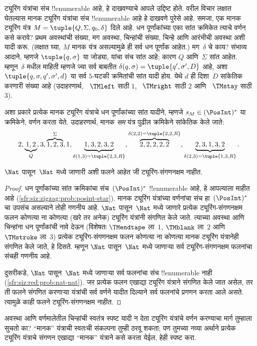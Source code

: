 \documentclass[../../../include/open-logic-section]{subfiles}
\begin{document}
\begin{explain}
ट्यूरिंग यंत्रांचा संच !!{enumerable}
आहे, हे दाखवण्याचे आपले उद्दिष्ट होते. वरील विचार
लक्षात घेतल्यास मानक ट्यूरिंग यंत्रांचा संच
!!{enumerable}
आहे हे दाखवणे पुरेसे आहे. समजा, एक मानक ट्यूरिंग
यंत्र $M = \tuple{Q, \Sigma, q_0, \delta}$ दिले
आहे. धन पूर्णांकांच्या एका सांत क्रमिकेत त्याचे
वर्णन कसे करावे? प्रथम अवस्थांची संख्या, मग
अवस्था, चिन्हांची संख्या, चिन्हे आणि आरंभीची
अवस्था अशी यादी करू. (लक्षात घ्या, $M$ मानक
यंत्र असल्यामुळे ही सर्व धन पूर्णांक आहेत.)
मग~$\delta$ चे काय? संभाव्य आदाने, म्हणजे
$\tuple{q,\sigma}$ या जोड्या, यांचा संच सांत आहे;
कारण $Q$ आणि~$\Sigma$ सांत आहेत. म्हणून~$\delta$
मधील माहिती म्हणजे ज्या सर्व बाबतीत
$\delta(q,\sigma) = \tuple{q', \sigma', D}$ आहे,
अशा $\tuple{q, \sigma, q', \sigma', d}$
या सर्व $5$-घटकी क्रमितांची सांत यादी होय.
येथे $d$ ही दिशा~$D$ सांकेतिक
करणारी संख्या आहे (उदाहरणार्थ,
~$\TMleft$ साठी $1$, ~$\TMright$ साठी $2$
आणि ~$\TMstay$ साठी $3$).

अशा प्रकारे प्रत्येक मानक ट्यूरिंग यंत्राचे
धन पूर्णांकांच्या सांत यादीने, म्हणजे
$s_M \in (\PosInt)^*$ या क्रमिकेने, वर्णन
करता येते. उदाहरणार्थ, मानक \emph{सम}
यंत्र पुढील क्रमिकेने सांकेतिक केले जाते:
\[
2, \underbrace{1, 2}_Q, 3, \overbrace{1, 2, 3}^\Sigma, 1, \underbrace{1, 3, 2, 3, 2}_{\delta(1,3) = \tuple{2,3,R}}, 
\overbrace{2, 2, 2, 2, 2}^{\delta(2,2) = \tuple{2,2,R}},
\underbrace{2, 3, 1, 3, 2}_{\delta(2,3) = \tuple{1,3,R}}.
\]
\end{explain}

\begin{thm}
$\Nat$ पासून~$\Nat$ मध्ये जाणारी अशी फलने
आहेत जी ट्यूरिंग-संगणनक्षम नाहीत.
\end{thm}

\begin{proof}
धन पूर्णांकांच्या सांत क्रमिकांचा संच~$(\PosInt)^*$
!!{enumerable} आहे, हे आपल्याला माहीत आहे
(\cref{sfr:siz:zigzag:prob:posint-star}). मानक ट्यूरिंग
यंत्रांच्या वर्णनांचा संच हा~$(\PosInt)^*$ चा उपसंच
असल्याने तोही गणनीय आहे. $\Nat$ पासून~$\Nat$
मध्ये जाणारे प्रत्येक ट्यूरिंग-संगणनक्षम फलन कोणत्या
ना कोणत्या (खरे तर अनेक) ट्यूरिंग यंत्रांनी संगणित
केले जाते. त्याच्या अवस्था आणि चिन्हांना धन
पूर्णांकांची नावे देऊन (विशेषतः $\TMendtape$ ला~$1$,
$\TMblank$ ला~$2$ आणि $\TMstroke$ ला~$3$)
प्रत्येक ट्यूरिंग-संगणनक्षम फलन कोणत्या ना कोणत्या
मानक ट्यूरिंग यंत्रानेही संगणित केले जाते, हे
दिसते. म्हणून $\Nat$ पासून~$\Nat$ मध्ये जाणाऱ्या
सर्व ट्यूरिंग-संगणनक्षम फलनांचा संचही गणनीय आहे.

दुसरीकडे, $\Nat$ पासून~$\Nat$ मध्ये जाणाऱ्या
सर्व फलनांचा संच !!{enumerable} नाही
(\cref{sfr:siz:red:prob:nat-nat}). जर प्रत्येक
फलन एखाद्या ट्यूरिंग यंत्राने संगणित केले
जात असेल, तर ती फलने संगणित करणाऱ्या यंत्रांची
सर्व वर्णने यादीत दिल्याने सर्व फलनांचे प्रगणन
करता आले असते. त्यामुळे काही फलने
ट्यूरिंग-संगणनक्षम नाहीत.
\end{proof}

\begin{prob}
  अवस्था आणि वर्णमालेतील चिन्हांची स्वतंत्र
  स्पष्ट यादी न देता ट्यूरिंग यंत्रांचे वर्णन
  करण्याचा मार्ग तुम्हाला सुचतो का? “मानक”
  यंत्राची स्वतःची संकल्पना तुम्ही ठरवू शकता;
  पण तुमच्या नव्या अर्थाने प्रत्येक ट्यूरिंग
  यंत्राचे संगणन एखाद्या “मानक” यंत्राने
  कसे करता येईल, हेही स्पष्ट करा.
\end{prob}
\end{document}
